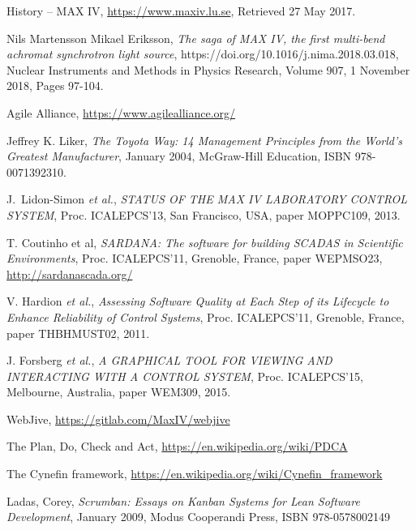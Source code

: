 \documentclass[a4paper,
              ]{jacow}
\begin{document}
\begin{thebibliography}{99} %

     History – MAX IV,
     \url{https://www.maxiv.lu.se}, Retrieved 27 May 2017.

    Nils Martensson Mikael Eriksson,
	\textit{The saga of MAX IV, the first multi-bend achromat synchrotron light source},
	https://doi.org/10.1016/j.nima.2018.03.018,	Nuclear Instruments and Methods in Physics Research, Volume 907, 1 November 2018, Pages 97-104.

    Agile Alliance,
    \url{https://www.agilealliance.org/}
    
    Jeffrey K. Liker,
    \textit{The Toyota Way: 14 Management Principles from the World's Greatest Manufacturer},
    January 2004, McGraw-Hill Education, ISBN 978-0071392310.

    J.~Lidon-Simon \emph{et al.},
    \textit{STATUS OF THE MAX IV LABORATORY CONTROL SYSTEM},
    Proc. ICALEPCS'13, San Francisco, USA, paper MOPPC109, 2013.

    T. Coutinho et al, \textit{SARDANA: The software for building SCADAS in Scientific Environments},
    Proc. ICALEPCS'11, Grenoble, France, paper WEPMSO23,
    \url{http://sardanascada.org/}

    V. Hardion \emph{et al.},
    \textit{Assessing Software Quality at Each Step of its Lifecycle to Enhance Reliability of Control Systems},
    Proc. ICALEPCS'11, Grenoble, France, paper THBHMUST02, 2011.

    J. Forsberg \emph{et al.},
	\textit{A GRAPHICAL TOOL FOR VIEWING AND INTERACTING WITH A CONTROL SYSTEM},
	Proc. ICALEPCS'15, Melbourne, Australia, paper WEM309, 2015.

    WebJive,
    \url{https://gitlab.com/MaxIV/webjive}

    The Plan, Do, Check and Act,
    \url{https://en.wikipedia.org/wiki/PDCA}

    The Cynefin framework,
    \url{https://en.wikipedia.org/wiki/Cynefin_framework}

    Ladas, Corey,
    \textit{Scrumban: Essays on Kanban Systems for Lean Software Development},
    January 2009,
    Modus Cooperandi Press, ISBN 978-0578002149


\end{thebibliography}


\end{document}
